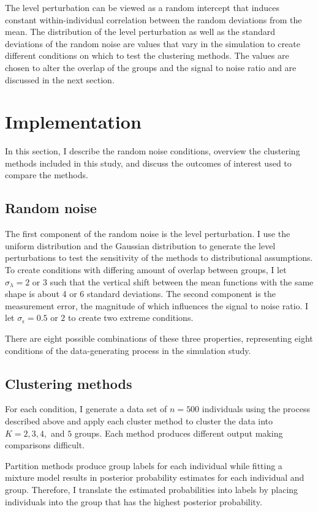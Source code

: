 The level perturbation can be viewed as a random intercept that induces constant within-individual correlation between the random deviations from the mean. The distribution of the level perturbation as well as the standard deviations of the random noise are values that vary in the simulation to create different conditions on which to test the clustering methods. The values are chosen to alter the overlap of the groups and the signal to noise ratio and are discussed in the next section.

\section{Implementation}
In this section, I describe the random noise conditions, overview the clustering methods included in this study, and discuss the outcomes of interest used to compare the methods. 
\subsection{Random noise}
The first component of the random noise is the level perturbation. I use the uniform distribution and the Gaussian distribution to generate the level perturbations to test the sensitivity of the methods to distributional assumptions. To create conditions with differing amount of overlap between groups, I let $\sigma_{\lambda}=2$ or $3$ such that the vertical shift between the mean functions with the same shape is about 4 or 6 standard deviations. The second component is the measurement error, the magnitude of which influences the signal to noise ratio. I let $\sigma_{\epsilon}=0.5$ or $2$ to create two extreme conditions. 

There are eight possible combinations of these three properties, representing eight conditions of the data-generating process in the simulation study. 
\subsection{Clustering methods}
For each condition, I generate a data set of $n=500$ individuals using the process described above and apply each cluster method to cluster the data into $K=2,3,4,$ and $5$ groups. Each method produces different output making comparisons difficult. 

Partition methods produce group labels for each individual while fitting a mixture model results in posterior probability estimates for each individual and group. Therefore, I translate the estimated probabilities into labels by placing individuals into the group that has the highest posterior probability.

